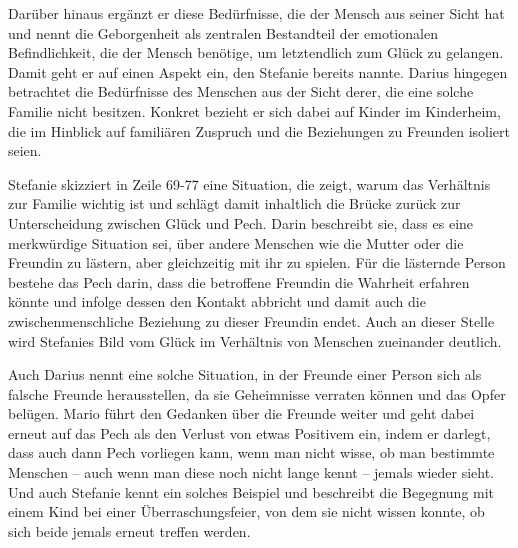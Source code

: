 Darüber hinaus ergänzt er diese Bedürfnisse, die der Mensch aus seiner Sicht hat und nennt die Geborgenheit als zentralen Bestandteil der emotionalen Befindlichkeit, die der Mensch benötige, um letztendlich zum Glück zu gelangen. 
Damit geht er auf einen Aspekt ein, den Stefanie bereits nannte. 
Darius hingegen betrachtet die Bedürfnisse des Menschen aus der Sicht derer, die eine solche Familie nicht besitzen. 
Konkret bezieht er sich dabei auf Kinder im Kinderheim, die im Hinblick auf familiären Zuspruch und die Beziehungen zu Freunden isoliert seien.
 
Stefanie skizziert in Zeile 69-77 eine Situation, die zeigt, warum das Verhältnis zur Familie wichtig ist und schlägt damit inhaltlich die Brücke zurück zur Unterscheidung zwischen Glück und Pech. 
Darin beschreibt sie, dass es eine merkwürdige Situation sei, über andere Menschen wie die Mutter oder die Freundin zu lästern, aber gleichzeitig mit ihr zu spielen. 
Für die lästernde Person bestehe das Pech darin, dass die betroffene Freundin die Wahrheit erfahren könnte und infolge dessen den Kontakt abbricht und damit auch die zwischenmenschliche Beziehung zu dieser Freundin endet. 
Auch an dieser Stelle wird Stefanies Bild vom Glück im Verhältnis von Menschen zueinander deutlich. 

Auch Darius nennt eine solche Situation, in der Freunde einer Person sich als falsche Freunde herausstellen, da sie Geheimnisse verraten können und das Opfer belügen.
Mario führt den Gedanken über die Freunde weiter und geht dabei erneut auf das Pech als den Verlust von etwas Positivem ein, indem er darlegt, dass auch dann Pech vorliegen kann, wenn man nicht wisse, ob man bestimmte Menschen -- auch wenn man diese noch nicht lange kennt -- jemals wieder sieht. 
Und auch Stefanie kennt ein solches Beispiel und beschreibt die Begegnung mit einem Kind bei einer Überraschungsfeier, von dem sie nicht wissen konnte, ob sich beide jemals erneut treffen werden.

